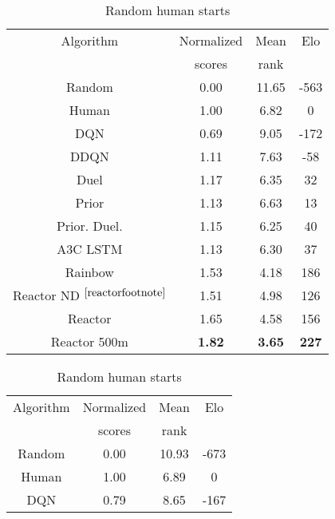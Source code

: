 \documentclass{article}
\begin{document}
\begin{table}[ht]
\centering
\hspace{-3cm}
\begin{minipage}{.55\textwidth}
\begin{center}
\begin{small}
\begin{sc}
\clearpage{}\begin{tabular}{| c | c | c | c |}
\hline
Algorithm & Normalized & Mean& Elo \\
 & scores & rank &\\
\hline
Random & 0.00 & 11.65 & -563\\
Human & 1.00 & 6.82 & 0\\
DQN & 0.69 & 9.05 & -172\\
DDQN & 1.11 & 7.63 & -58\\
Duel & 1.17 & 6.35 & 32\\
Prior & 1.13 & 6.63 & 13\\
Prior. Duel. & 1.15 & 6.25 & 40\\
A3C LSTM & 1.13 & 6.30 & 37\\
Rainbow & 1.53 & 4.18 & 186\\
Reactor ND $^{\ref{reactorfootnote}}$ & 1.51 & 4.98 & 126\\
Reactor & 1.65 & 4.58 & 156\\
Reactor 500m & {\bf 1.82} & {\bf 3.65} & {\bf 227}\\
\hline
\end{tabular}
\clearpage{}\hfill
\end{sc}
\end{small}
\end{center}
\vspace{-0.2 in}
\caption{\small Random human starts}
\label{comparison-table1}
\end{minipage}
\begin{minipage}{.35\textwidth}
\begin{center}
\begin{small}
\begin{sc}
\hspace{2cm} \clearpage{}\begin{tabular}{| c | c | c | c |}
\hline
Algorithm & Normalized & Mean& Elo \\
 & scores & rank &\\
\hline
Random & 0.00 & 10.93 & -673\\
Human & 1.00 & 6.89 & 0\\
DQN & 0.79 & 8.65 & -167\\

\end{tabular}
\end{sc}
\end{small}
\end{center}
\end{minipage}
\end{table}
\end{document}
